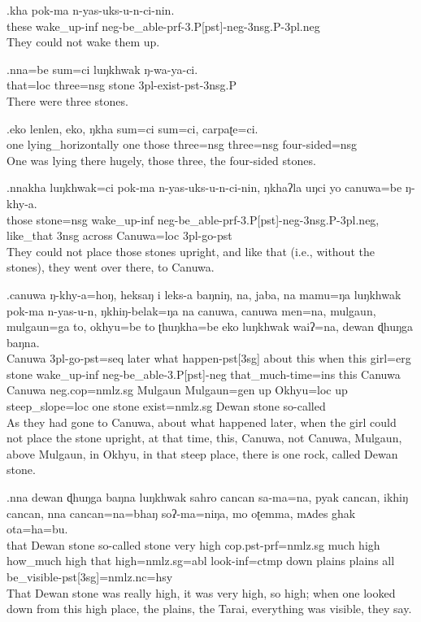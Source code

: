 \exg.kha pok-ma  n-yas-uks-u-n-ci-nin.\\
these wake\_up{\sc -inf}   {\sc neg-}be\_able{\sc -prf-3.P[pst]-neg-3nsg.P-3pl.neg}\\
They could not wake them up.

\exg.nna=be sum=ci luŋkhwak ŋ-wa-ya-ci.\\
that{\sc =loc} three{\sc =nsg} stone {\sc 3pl-}exist{\sc -pst-3nsg.P}\\
There were three stones.

\exg.eko lenlen,   eko, ŋkha sum=ci sum=ci, carpaʈe=ci.\\
one lying\_horizontally one those three{\sc =nsg} three{\sc =nsg} four-sided{\sc =nsg}\\
One was lying there hugely, those three, the four-sided stones.

\exg.nnakha luŋkhwak=ci  pok-ma  n-yas-uks-u-n-ci-nin,     ŋkhaʔla uŋci yo canuwa=be ŋ-khy-a.\\
those  stone{\sc =nsg} wake\_up{\sc -inf} {\sc neg-}be\_able{\sc -prf-3.P[pst]-neg-3nsg.P-3pl.neg}, like\_that {\sc 3nsg}  across  Canuwa{\sc =loc} {\sc 3pl-}go{\sc -pst}\\
They could not place those stones upright, and like that (i.e., without the stones), they went over there, to Canuwa.

\exg.canuwa  ŋ-khy-a=hoŋ,  heksaŋ i  leks-a  baŋniŋ, na, jaba, na mamu=ŋa luŋkhwak pok-ma  n-yas-u-n, ŋkhiŋ-belak=ŋa na canuwa,  canuwa  men=na, mulgaun, mulgaun=ga  to, okhyu=be  to  ʈhuŋkha=be  eko luŋkhwak waiʔ=na,   dewan  ɖhuŋga baŋna.\\
Canuwa {\sc 3pl-}go{\sc -pst=seq}  later what happen{\sc -pst[3sg]} about this when this girl{\sc =erg} stone wake\_up{\sc -inf} {\sc neg-}be\_able{\sc -3.P[pst]-neg} that\_much-time{\sc =ins} this Canuwa Canuwa {\sc neg.cop=nmlz.sg} Mulgaun Mulgaun{\sc =gen} up Okhyu{\sc =loc} up  steep\_slope{\sc =loc} one stone exist{\sc [3sg]=nmlz.sg} Dewan stone  so-called\\
As they had gone to Canuwa, about what happened later, when the girl could not place the stone upright, at that time, this, Canuwa, not Canuwa, Mulgaun, above Mulgaun, in Okhyu, in that steep place, there is one rock, called Dewan stone.

\exg.nna  dewan  ɖhuŋga baŋna  luŋkhwak sahro cancan sa-ma=na,  pyak cancan, ikhiŋ cancan, nna  cancan=na=bhaŋ  soʔ-ma=niŋa,  mo oʈemma, mʌdes ghak ota=ha=bu.\\
that Dewan stone  so-called stone very  high {\sc cop.pst-prf=nmlz.sg} much high how\_much high that high{\sc =nmlz.sg=abl} look{\sc -inf=ctmp} down plains  plains all  be\_visible{\sc -pst[3sg]=nmlz.nc=hsy}\\
That Dewan stone was really high, it was very high, so high; when one looked down from this high place, the
plains, the Tarai, everything was visible, they say.

